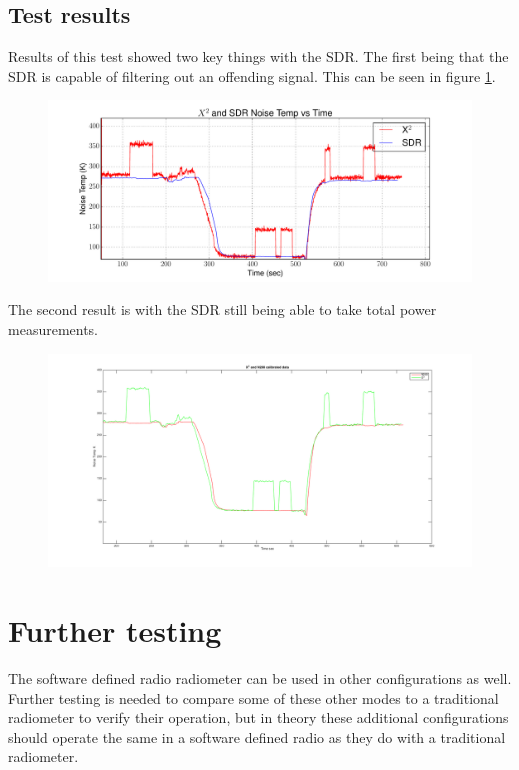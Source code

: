 \subsection{Test results}
Results of this test showed two key things with the SDR.  The first being that the SDR is capable of filtering out an offending signal.  This can be seen in figure \ref{filter_on}.

\begin{figure}[h!tb] \centering

\includegraphics[width=\textwidth]{Experiments/Exp4/calib_filtered_both.pdf}

\label{filter_on}
\end{figure}

The second result is with the SDR still being able to take total power measurements. 

\begin{figure}[h!tb] \centering

\includegraphics[width=\textwidth]{Images/moneyshot.png}

\label{sdr_x2_filter}
\end{figure} 

\section{Further testing}
The software defined radio radiometer can be used in other configurations as well.  Further testing is needed to compare some of these other modes to a traditional radiometer to verify their operation, but in theory these additional configurations should operate the same in a software defined radio as they do with a traditional radiometer.
